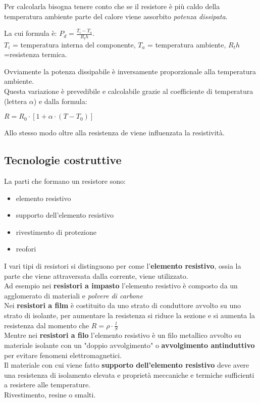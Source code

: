 \documentclass{article}
\begin{document}
Per calcolarla bisogna tenere conto che se il resistore è più caldo della temperatura ambiente parte del calore viene assorbito \textit{potenza dissipata}.
\begin{center}
    La cui formula è: $P_d=\frac{T_i-T_a}{R_th}$.\\
$T_i$ = temperatura interna del componente, $T_a$ = temperatura ambiente, $R_th$=resistenza termica.
\end{center}
Ovviamente la potenza dissipabile è inversamente proporzionale alla temperatura ambiente.\\
Questa variazione è prevedibile e calcolabile grazie al coefficiente di temperatura (lettera $\alpha$) e dalla formula:
\begin{center}
    $R=R_0\cdot[1+\alpha\cdot(T-T_0)]$
\end{center}
Allo stesso modo oltre alla resistenza de viene influenzata la resistività.\\
\subsection{Tecnologie costruttive}
La parti che formano un resistore sono:
\begin{itemize}
    \item elemento resistivo
    \item supporto dell'elemento resistivo
    \item rivestimento di protezione
    \item reofori
\end{itemize}
I vari tipi di resistori si distinguono per come l'\textbf{elemento resistivo}, ossia la parte che viene attraversata dalla corrente, viene utilizzato.\\
Ad esempio nei \textbf{resistori a impasto} l'elemento resistivo è composto da un agglomerato di materiali e \emph{polvere di carbone}\\
Nei \textbf{resistori a film} è costituito da uno strato di conduttore avvolto su uno strato di isolante, per aumentare la resistenza si riduce la sezione e si aumenta la resistenza dal momento che $R=\rho\cdot\frac{l}{S}$\\
Mentre nei\textbf{ resistori a filo} l'elemento resistivo è un filo metallico avvolto su materiale isolante con un "doppio avvolgimento" o \textbf{avvolgimento antinduttivo} per evitare fenomeni elettromagnetici.\\
Il materiale con cui viene fatto \textbf{supporto dell'elemento resistivo} deve avere una resistenza di isolamento elevata e proprietà meccaniche e termiche sufficienti a resistere alle temperature.\\
Rivestimento, resine o smalti.
\end{document}
